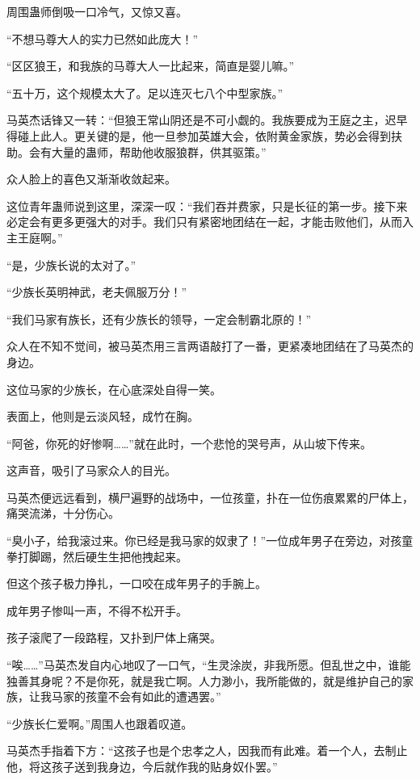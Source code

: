 \begin{this_body}
周围蛊师倒吸一口冷气，又惊又喜。

“不想马尊大人的实力已然如此庞大！”

“区区狼王，和我族的马尊大人一比起来，简直是婴儿嘛。”

“五十万，这个规模太大了。足以连灭七八个中型家族。”

马英杰话锋又一转：“但狼王常山阴还是不可小觑的。我族要成为王庭之主，迟早得碰上此人。更关键的是，他一旦参加英雄大会，依附黄金家族，势必会得到扶助。会有大量的蛊师，帮助他收服狼群，供其驱策。”

众人脸上的喜色又渐渐收敛起来。

这位青年蛊师说到这里，深深一叹：“我们吞并费家，只是长征的第一步。接下来必定会有更多更强大的对手。我们只有紧密地团结在一起，才能击败他们，从而入主王庭啊。”

“是，少族长说的太对了。”

“少族长英明神武，老夫佩服万分！”

“我们马家有族长，还有少族长的领导，一定会制霸北原的！”

众人在不知不觉间，被马英杰用三言两语敲打了一番，更紧凑地团结在了马英杰的身边。

这位马家的少族长，在心底深处自得一笑。

表面上，他则是云淡风轻，成竹在胸。

“阿爸，你死的好惨啊……”就在此时，一个悲怆的哭号声，从山坡下传来。

这声音，吸引了马家众人的目光。

马英杰便远远看到，横尸遍野的战场中，一位孩童，扑在一位伤痕累累的尸体上，痛哭流涕，十分伤心。

“臭小子，给我滚过来。你已经是我马家的奴隶了！”一位成年男子在旁边，对孩童拳打脚踢，然后硬生生把他拽起来。

但这个孩子极力挣扎，一口咬在成年男子的手腕上。

成年男子惨叫一声，不得不松开手。

孩子滚爬了一段路程，又扑到尸体上痛哭。

“唉……”马英杰发自内心地叹了一口气，“生灵涂炭，非我所愿。但乱世之中，谁能独善其身呢？不是你死，就是我亡啊。人力渺小，我所能做的，就是维护自己的家族，让我马家的孩童不会有如此的遭遇罢。”

“少族长仁爱啊。”周围人也跟着叹道。

马英杰手指着下方：“这孩子也是个忠孝之人，因我而有此难。着一个人，去制止他，将这孩子送到我身边，今后就作我的贴身奴仆罢。”


\end{this_body}
